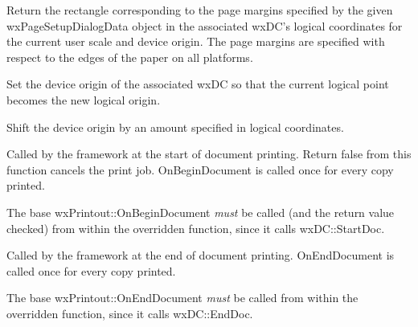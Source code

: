 \label{wxprintoutgetlogicalpagemarginsrect}


Return the rectangle corresponding to the page margins specified by the given
wxPageSetupDialogData object in the associated wxDC's logical coordinates for the
current user scale and device origin. The page margins are specified
with respect to the edges of the paper on all platforms.


\label{wxprintoutsetlogicalorigin}


Set the device origin of the associated wxDC so that the current logical point
becomes the new logical origin.


\label{wxprintoutoffsetlogicalorigin}


Shift the device origin by an amount specified in logical coordinates.


\label{wxprintoutonbegindocument}


Called by the framework at the start of document printing. Return false from
this function cancels the print job. OnBeginDocument is called once for every
copy printed.

The base wxPrintout::OnBeginDocument {\it must} be called (and the return value
checked) from within the overridden function, since it calls wxDC::StartDoc.



\label{wxprintoutonenddocument}


Called by the framework at the end of document printing. OnEndDocument
is called once for every copy printed.

The base wxPrintout::OnEndDocument {\it must} be called
from within the overridden function, since it calls wxDC::EndDoc.


